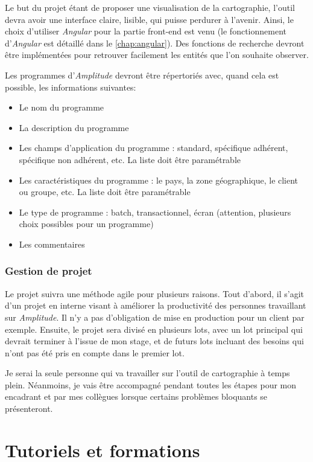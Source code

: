 \documentclass{polytech/polytech}
\begin{document}
Le but du projet étant de proposer une visualisation de la cartographie, l'outil devra avoir une interface claire, lisible, qui puisse perdurer à l'avenir. Ainsi, le choix d'utiliser \textit{Angular} pour la partie front-end est venu (le fonctionnement d'\textit{Angular} est détaillé dans le \autoref{chap:angular}). Des fonctions de recherche devront être implémentées pour retrouver facilement les entités que l'on souhaite observer.

Les programmes d'\textit{Amplitude} devront être répertoriés avec, quand cela est possible, les informations suivantes:

\begin{itemize}
	\item Le nom du programme
	\item La description du programme
	\item Les champs d’application du programme : standard, spécifique adhérent, spécifique non adhérent, etc. La liste doit être paramétrable
	\item Les caractéristiques du programme : le pays, la zone géographique, le client ou groupe, etc. La liste doit être paramétrable
	\item Le type de programme : batch, transactionnel, écran (attention, plusieurs choix possibles pour un programme)
	\item Les commentaires
\end{itemize}


\section{Gestion de projet}

Le projet suivra une méthode agile pour plusieurs raisons. Tout d'abord, il s'agit d'un projet en interne visant à améliorer la productivité des personnes travaillant sur \textit{Amplitude}. Il n'y a pas d'obligation de mise en production pour un client par exemple. Ensuite, le projet sera divisé en plusieurs lots, avec un lot principal qui devrait terminer à l'issue de mon stage, et de futurs lots incluant des besoins qui n'ont pas été pris en compte dans le premier lot.  

Je serai la seule personne qui va travailler sur l'outil de cartographie à temps plein. Néanmoins, je vais être accompagné pendant toutes les étapes pour mon encadrant et par mes collègues lorsque certains problèmes bloquants se présenteront.


\part{Tutoriels et formations}
\end{document}
